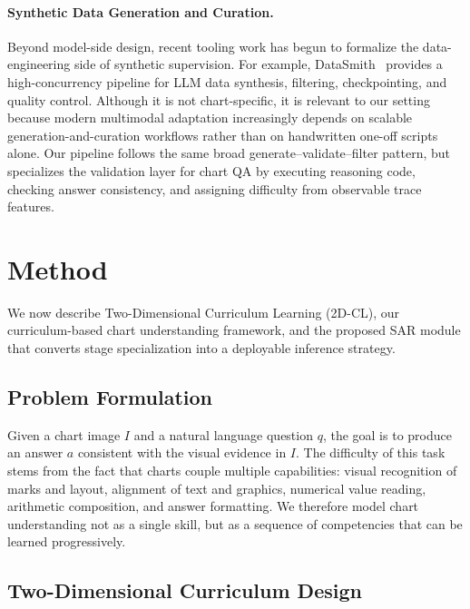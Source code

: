 \documentclass[journal]{IEEEtran}
\newcommand{\method}{2D-CL}
\newcommand{\fullmethod}{Two-Dimensional Curriculum Learning}
\newcommand{\sar}{SAR}
\begin{document}
\paragraph{Synthetic Data Generation and Curation.}
Beyond model-side design, recent tooling work has begun to formalize the data-engineering side of synthetic supervision.
For example, DataSmith~\cite{datasmith2026} provides a high-concurrency pipeline for LLM data synthesis, filtering, checkpointing, and quality control.
Although it is not chart-specific, it is relevant to our setting because modern multimodal adaptation increasingly depends on scalable generation-and-curation workflows rather than on handwritten one-off scripts alone.
Our pipeline follows the same broad generate--validate--filter pattern, but specializes the validation layer for chart QA by executing reasoning code, checking answer consistency, and assigning difficulty from observable trace features.

\section{Method}
We now describe \fullmethod{} (\method{}), our curriculum-based chart understanding framework, and the proposed \sar{} module that converts stage specialization into a deployable inference strategy.

\subsection{Problem Formulation}
\label{sec:problem}
Given a chart image $I$ and a natural language question $q$, the goal is to produce an answer $a$ consistent with the visual evidence in $I$.
The difficulty of this task stems from the fact that charts couple multiple capabilities: visual recognition of marks and layout, alignment of text and graphics, numerical value reading, arithmetic composition, and answer formatting.
We therefore model chart understanding not as a single skill, but as a sequence of competencies that can be learned progressively.

\subsection{Two-Dimensional Curriculum Design}
\label{sec:2d_curriculum}
\end{document}
